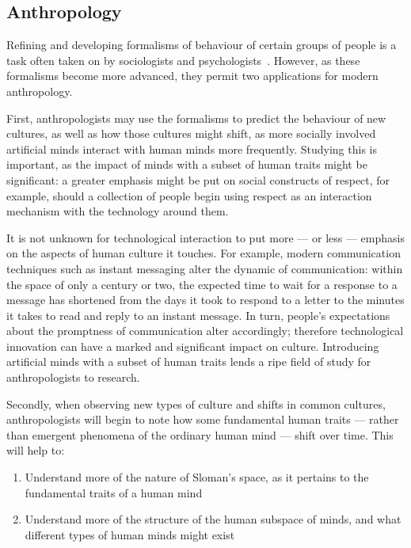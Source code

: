 \subsection{Anthropology}
Refining and developing formalisms of behaviour of certain groups of people is a task often taken on by sociologists and psychologists~\citep{Gambetta1988, luhmann2000familiarity}. However, as these formalisms become more advanced, they permit two applications for modern anthropology.\par

First, anthropologists may use the formalisms to predict the behaviour of new cultures, as well as how those cultures might shift, as more socially involved artificial minds interact with human minds more frequently. Studying this is important, as the impact of minds with a subset of human traits might be significant: a greater emphasis might be put on social constructs of respect, for example, should a collection of people begin using respect as an interaction mechanism with the technology around them. \par

It is not unknown for technological interaction to put more --- or less --- emphasis on the aspects of human culture it touches. For example, modern communication techniques such as instant messaging alter the dynamic of communication: within the space of only a century or two, the expected time to wait for a response to a message has shortened from the days it took to respond to a letter to the minutes it takes to read and reply to an instant message. In turn, people's expectations about the promptness of communication alter accordingly; therefore technological innovation can have a marked and significant impact on culture. Introducing artificial minds with a subset of human traits lends a ripe field of study for anthropologists to research.\par

Secondly, when observing new types of culture and shifts in common cultures, anthropologists will begin to note how some fundamental human traits --- rather than emergent phenomena of the ordinary human mind --- shift over time. This will help to:

\begin{enumerate}
    \item Understand more of the nature of Sloman's space, as it pertains to the fundamental traits of a human mind
    \item Understand more of the structure of the human subspace of minds, and what different types of human minds might exist
\end{enumerate}


